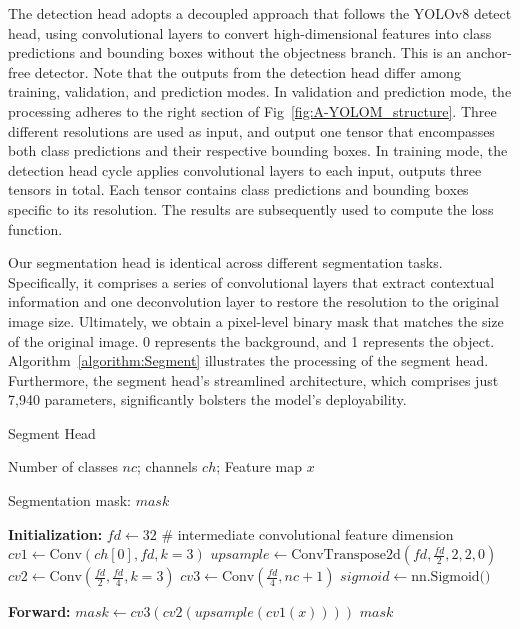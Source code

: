\documentclass[lettersize,journal]{IEEEtran}
\newcommand{\INPUT}{\item[\textbf{Input:}]}
\newcommand{\OUTPUT}{\item[\textbf{Output:}]}
\begin{document}
The detection head adopts a decoupled approach that follows the YOLOv8 detect head, using convolutional layers to convert high-dimensional features into class predictions and bounding boxes without the objectness branch. This is an anchor-free detector. Note that the outputs from the detection head differ among training, validation, and prediction modes. In validation and prediction mode, the processing adheres to the right section of Fig~\ref{fig:A-YOLOM_structure}. Three different resolutions are used as input, and output one tensor that encompasses both class predictions and their respective bounding boxes. In training mode, the detection head cycle applies convolutional layers to each input, outputs three tensors in total. Each tensor contains class predictions and bounding boxes specific to its resolution. The results are subsequently used to compute the loss function. 

Our segmentation head is identical across different segmentation tasks. Specifically, it comprises a series of convolutional layers that extract contextual information and one deconvolution layer to restore the resolution to the original image size. Ultimately, we obtain a pixel-level binary mask that matches the size of the original image. 0 represents the background, and 1 represents the object. Algorithm~\ref{algorithm:Segment} illustrates the processing of the segment head. Furthermore, the segment head's streamlined architecture, which comprises just 7,940 parameters, significantly bolsters the model's deployability.

\begin{algorithm}[h]
\caption{Segment Head}
\label{algorithm:Segment}
\begin{algorithmic}[1]
\INPUT Number of classes \( nc \); channels \( ch \); Feature map \( x \)
\OUTPUT Segmentation mask: \( mask \)

\STATE \textbf{Initialization:}
\STATE \( fd \leftarrow 32 \) \# intermediate convolutional feature dimension
\STATE \( cv1 \leftarrow \text{Conv}(ch[0], fd, k=3) \)
\STATE \( upsample \leftarrow \text{ConvTranspose2d}(fd, \frac{fd}{2}, 2, 2, 0) \)
\STATE \( cv2 \leftarrow \text{Conv}(\frac{fd}{2}, \frac{fd}{4}, k=3) \)
\STATE \( cv3 \leftarrow \text{Conv}(\frac{fd}{4}, nc+1) \)
\STATE \( sigmoid \leftarrow \text{nn.Sigmoid()} \)

\STATE \textbf{Forward:}
\STATE \( mask \leftarrow cv3(cv2(upsample(cv1(x)))) \)
\RETURN \( mask \)
\end{algorithmic}
\end{algorithm}
\end{document}
